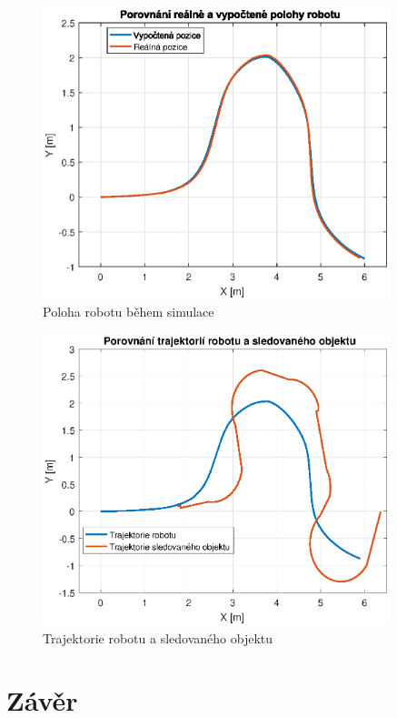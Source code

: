 \documentclass[twoside]{ctuthesis}
\theoremstyle{plain}
\theoremstyle{definition}
\theoremstyle{note}
\begin{document}
\begin{figure}
	\caption{Poloha robotu během simulace}
	
	\label{rob_pos}
	\includegraphics[width=0.9\textwidth]{images/5/pos_rob.eps}
\end{figure}
\begin{figure}
	\caption{Trajektorie robotu a sledovaného objektu}
	
	\label{trajektorie}
	\includegraphics[width=0.9\textwidth]{images/5/trajektorie.eps}
\end{figure}
\chapter{Závěr}
\appendix

\printindex

%
%
\end{document}
